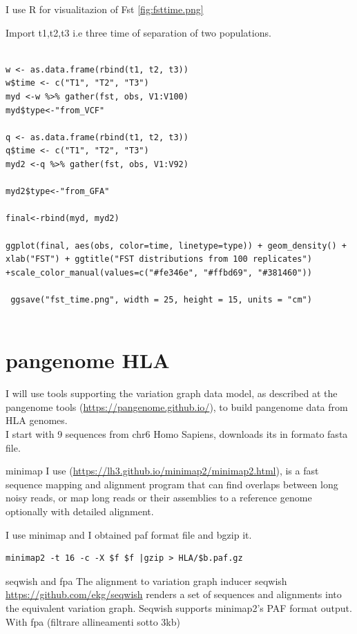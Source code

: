 I use R for visualitazion of Fst \ref{fig:fsttime.png}

Import t1,t2,t3 i.e three time of separation of two populations.

\begin{verbatim}

w <- as.data.frame(rbind(t1, t2, t3))
w$time <- c("T1", "T2", "T3")
myd <-w %>% gather(fst, obs, V1:V100)
myd$type<-"from_VCF"

q <- as.data.frame(rbind(t1, t2, t3))
q$time <- c("T1", "T2", "T3")
myd2 <-q %>% gather(fst, obs, V1:V92)

myd2$type<-"from_GFA"

final<-rbind(myd, myd2)

ggplot(final, aes(obs, color=time, linetype=type)) + geom_density() + xlab("FST") + ggtitle("FST distributions from 100 replicates") +scale_color_manual(values=c("#fe346e", "#ffbd69", "#381460"))

 ggsave("fst_time.png", width = 25, height = 15, units = "cm")
 
\end{verbatim}

\section{pangenome HLA}

I will use tools supporting the variation graph data model, as described at the pangenome tools (\url{https://pangenome.github.io/}), to build pangenome data from HLA genomes.\\

I start with 9 sequences from chr6 Homo Sapiens, downloads its in formato fasta file. 


\item minimap 
I use (\url{https://lh3.github.io/minimap2/minimap2.html}), is a fast sequence mapping and alignment program that can find overlaps between long noisy reads, or map long reads or their assemblies to a reference genome optionally with detailed alignment. 

I use minimap and I obtained paf format file and bgzip it.

\begin{verbatim}
minimap2 -t 16 -c -X $f $f |gzip > HLA/$b.paf.gz 
\end{verbatim}


\item seqwish and fpa
The alignment to variation graph inducer seqwish \url{https://github.com/ekg/seqwish} renders a set of sequences and alignments into the equivalent variation graph.
Seqwish supports minimap2's PAF format output.
With fpa (filtrare allineamenti sotto 3kb)
    
